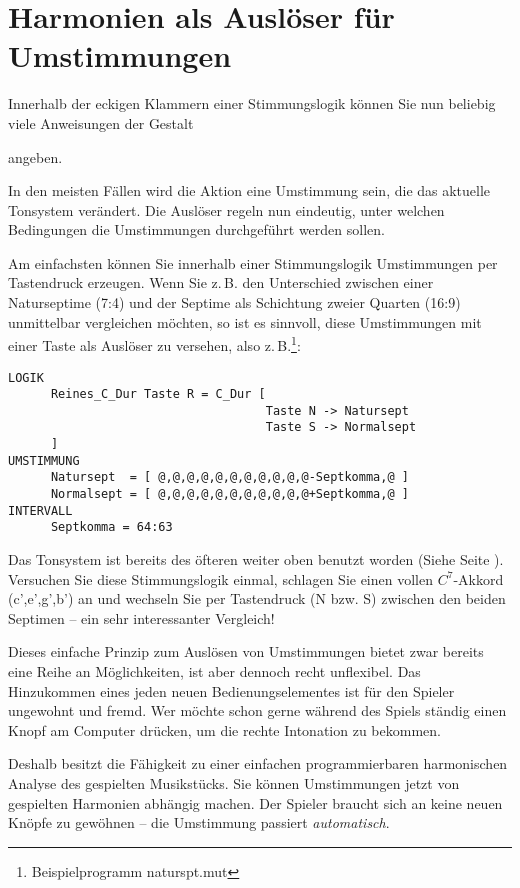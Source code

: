 \section{Harmonien als Auslöser für Um\-stim\-mun\-gen}\label{sec:harm-als-ausl}
Innerhalb der eckigen Klammern einer Stimmungslogik können Sie nun
beliebig viele Anweisungen der Gestalt


\noindent angeben.

In den meisten Fällen wird die Aktion eine Umstimmung sein, die das
aktuelle Tonsystem verändert. Die Auslöser regeln nun eindeutig, unter
welchen Bedingungen die Umstimmungen durchgeführt werden sollen.

Am einfachsten können Sie innerhalb einer Stimmungslogik Umstimmungen
per Tastendruck erzeugen. Wenn Sie z.\,B. den Unterschied zwischen einer
Naturseptime (7:4) und der Septime als Schichtung zweier Quarten
(16:9) unmittelbar vergleichen möchten, so ist es sinnvoll, diese
Umstimmungen mit einer Taste als Auslöser zu versehen, also
z.\,B.\footnote{Beispielprogramm naturspt.mut}:
\label{NATURSPT}
\begin {verbatim}
LOGIK
      Reines_C_Dur Taste R = C_Dur [
                                    Taste N -> Natursept
                                    Taste S -> Normalsept
      ]
UMSTIMMUNG
      Natursept  = [ @,@,@,@,@,@,@,@,@,@,@-Septkomma,@ ]
      Normalsept = [ @,@,@,@,@,@,@,@,@,@,@+Septkomma,@ ]
INTERVALL
      Septkomma = 64:63
\end{verbatim}
Das Tonsystem  ist bereits des öfteren weiter oben benutzt
worden (Siehe Seite \pageref{CDUR}). Versuchen Sie diese
Stimmungslogik einmal, schlagen Sie einen vollen $C^7$-Akkord
(c',e',g',b') an und wechseln Sie per Tastendruck
 (N bzw. S) zwischen
den beiden Septimen -- ein sehr interessanter Vergleich!

Dieses einfache Prinzip zum Auslösen von Umstimmungen bietet zwar
bereits eine Reihe an Möglichkeiten, ist aber dennoch recht
unflexibel. Das Hinzukommen eines jeden neuen Bedienungselementes ist
für den Spieler ungewohnt und fremd. Wer möchte schon gerne
während des Spiels ständig einen Knopf am Computer drücken, um die
rechte Intonation zu bekommen.

Deshalb besitzt \mutabor{} die Fähigkeit zu einer einfachen
programmierbaren harmonischen Analyse des gespielten Musikstücks.
Sie können Umstimmungen jetzt von gespielten Harmonien abhängig
machen. Der Spieler braucht sich an
keine neuen Knöpfe zu gewöhnen -- die Umstimmung passiert
\emph{automatisch}.

